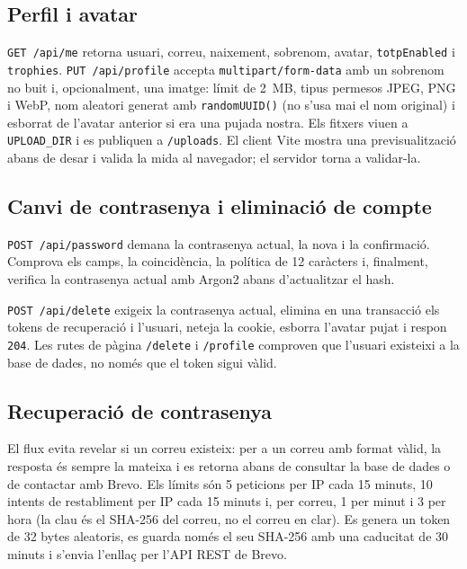 \documentclass[11pt,a4paper]{article}
\begin{document}
\subsection{Perfil i avatar}

\texttt{GET /api/me} retorna usuari, correu, naixement, sobrenom, avatar,
\texttt{totpEnabled} i \texttt{trophies}. \texttt{PUT /api/profile} accepta
\texttt{multipart/form-data} amb un sobrenom no buit i, opcionalment, una imatge: límit
de 2~MB, tipus permesos JPEG, PNG i WebP, nom aleatori generat amb
\texttt{randomUUID()} (no s'usa mai el nom original) i esborrat de l'avatar anterior si
era una pujada nostra. Els fitxers viuen a \texttt{UPLOAD\_DIR} i es publiquen a
\texttt{/uploads}. El client Vite mostra una previsualització abans de desar i valida la
mida al navegador; el servidor torna a validar-la.

\subsection{Canvi de contrasenya i eliminació de compte}

\texttt{POST /api/password} demana la contrasenya actual, la nova i la confirmació.
Comprova els camps, la coincidència, la política de 12 caràcters i, finalment, verifica
la contrasenya actual amb Argon2 abans d'actualitzar el hash.

\texttt{POST /api/delete} exigeix la contrasenya actual, elimina en una transacció els
tokens de recuperació i l'usuari, neteja la cookie, esborra l'avatar pujat i respon
\texttt{204}. Les rutes de pàgina \texttt{/delete} i \texttt{/profile} comproven que
l'usuari existeixi a la base de dades, no només que el token sigui vàlid.

\subsection{Recuperació de contrasenya}

El flux evita revelar si un correu existeix: per a un correu amb format vàlid, la
resposta és sempre la mateixa i es retorna abans de consultar la base de dades o de
contactar amb Brevo. Els límits són 5 peticions per IP cada 15 minuts, 10 intents de
restabliment per IP cada 15 minuts i, per correu, 1 per minut i 3 per hora (la clau és
el SHA-256 del correu, no el correu en clar). Es genera un token de 32 bytes
aleatoris, es guarda només el seu SHA-256 amb una caducitat de 30 minuts i s'envia
l'enllaç per l'API REST de Brevo\@.
\end{document}

